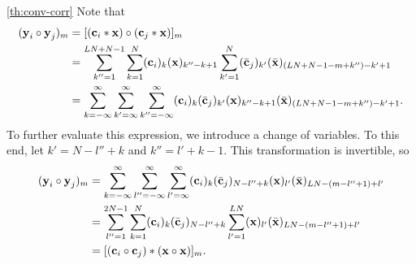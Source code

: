\documentclass[a4paper, openany, oneside]{memoir}
\begin{document}
\begin{blockProofTheorem}{\ref{th:conv-corr}}
    Note that
    \begin{align*}
        (\boldsymbol{\mathbf{y}}_i \circ \boldsymbol{\mathbf{y}}_j)_m
        &= [(\boldsymbol{\mathbf{c}}_i \ast \boldsymbol{\mathbf{x}}) \circ (\boldsymbol{\mathbf{c}}_j \ast \boldsymbol{\mathbf{x}})]_m \\
        &=\sum_{k''=1}^{LN+N-1}\sum_{k=1}^N (\boldsymbol{\mathbf{c}}_i)_k (\boldsymbol{\mathbf{x}})_{k''-k+1}\sum_{k'=1}^{N}(\bar{\boldsymbol{\mathbf{c}}}_j)_{k'}(\bar{\boldsymbol{\mathbf{x}}})_{(LN+N-1-m+k'')-k'+1} \\
        &=\sum_{k=-\infty}^\infty\sum_{k'=\infty}^{\infty}\sum_{k''=-\infty}^{\infty} (\boldsymbol{\mathbf{c}}_i)_k (\bar{\boldsymbol{\mathbf{c}}}_j)_{k'}(\boldsymbol{\mathbf{x}})_{k''-k+1}(\bar{\boldsymbol{\mathbf{x}}})_{(LN+N-1-m+k'')-k'+1}.
    \end{align*}
    To further evaluate this expression, we introduce a change of variables. To this end, let $k' = N -l'' +k$ and $k'' = l' + k - 1$. This transformation is invertible, so
    \begin{align*}
        (\boldsymbol{\mathbf{y}}_i \circ \boldsymbol{\mathbf{y}}_j)_m
        &=\sum_{k=-\infty}^\infty\sum_{l''=-\infty}^{\infty}\sum_{l'=\infty}^{\infty} (\boldsymbol{\mathbf{c}}_i)_k (\bar{\boldsymbol{\mathbf{c}}}_j)_{N -l'' +k}(\boldsymbol{\mathbf{x}})_{l'}
        (\bar{\boldsymbol{\mathbf{x}}})_{LN-(m-l'' + 1)+l'} \\
        &=\sum_{l''=1}^{2N-1}\sum_{k=1}^{N}(\boldsymbol{\mathbf{c}}_i)_k (\bar{\boldsymbol{\mathbf{c}}}_j)_{N -l'' +k}\sum_{l'=1}^{LN}(\boldsymbol{\mathbf{x}})_{l'}
        (\bar{\boldsymbol{\mathbf{x}}})_{LN-(m-l'' + 1)+l'} \\
        &=[(\boldsymbol{\mathbf{c}}_i \circ \boldsymbol{\mathbf{c}}_j) \ast (\boldsymbol{\mathbf{x}} \circ \boldsymbol{\mathbf{x}})]_m.
    \end{align*}
\end{blockProofTheorem}
\end{document}
